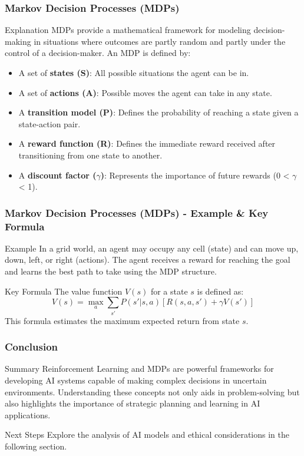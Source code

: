 \documentclass[aspectratio=169]{beamer}
\begin{document}
\begin{frame}[fragile]
    \frametitle{Markov Decision Processes (MDPs)}
    \begin{block}{Explanation}
        MDPs provide a mathematical framework for modeling decision-making in situations where outcomes are partly random and partly under the control of a decision-maker. An MDP is defined by:
        \begin{itemize}
            \item A set of \textbf{states (S)}: All possible situations the agent can be in.
            \item A set of \textbf{actions (A)}: Possible moves the agent can take in any state.
            \item A \textbf{transition model (P)}: Defines the probability of reaching a state given a state-action pair.
            \item A \textbf{reward function (R)}: Defines the immediate reward received after transitioning from one state to another.
            \item A \textbf{discount factor ($\gamma$)}: Represents the importance of future rewards (0 < $\gamma$ < 1).
        \end{itemize}
    \end{block}
\end{frame}

\begin{frame}[fragile]
    \frametitle{Markov Decision Processes (MDPs) - Example & Key Formula}
    \begin{block}{Example}
        In a grid world, an agent may occupy any cell (state) and can move up, down, left, or right (actions). The agent receives a reward for reaching the goal and learns the best path to take using the MDP structure.
    \end{block}

    \begin{block}{Key Formula}
        The value function \( V(s) \) for a state \( s \) is defined as:
        \begin{equation}
            V(s) = \max_a \sum_{s'} P(s' | s, a) [R(s, a, s') + \gamma V(s')]
        \end{equation}
        This formula estimates the maximum expected return from state \( s \).
    \end{block}
\end{frame}

\begin{frame}[fragile]
    \frametitle{Conclusion}
    \begin{block}{Summary}
        Reinforcement Learning and MDPs are powerful frameworks for developing AI systems capable of making complex decisions in uncertain environments. Understanding these concepts not only aids in problem-solving but also highlights the importance of strategic planning and learning in AI applications.
    \end{block}

    \begin{block}{Next Steps}
        Explore the analysis of AI models and ethical considerations in the following section.
    \end{block}
\end{frame}
\end{document}
